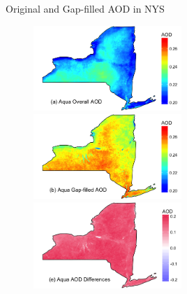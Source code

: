 \documentclass{beamer}
\begin{document}
\begin{frame}{Original and Gap-filled AOD in NYS}
    \begin{figure}
        \centering
        \includegraphics[width=0.5\textwidth]{img/appendix/Aim1/figure21.png}
        \includegraphics[width=0.5\textwidth]{img/appendix/Aim1/figure22.png} \\
        \includegraphics[width=0.5\textwidth]{img/appendix/Aim1/figure25.png}
    \end{figure}
\end{frame}
\end{document}
